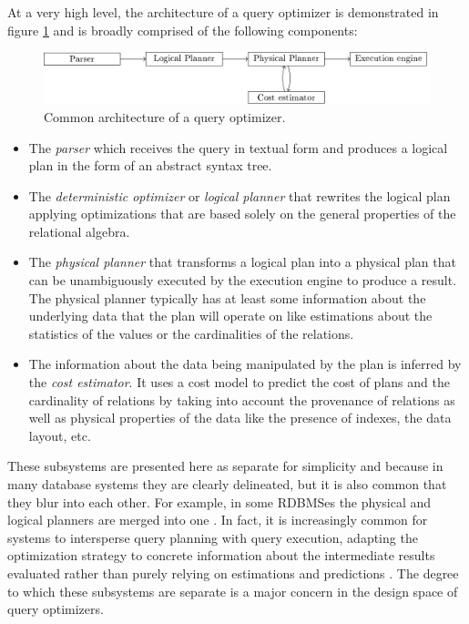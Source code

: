 At a very high level, the architecture of a query optimizer is
demonstrated in figure \ref{fig:optimizer_arch} and is broadly
comprised of the following components:

\begin{figure}[H]
\centering
\includegraphics[width=\textwidth]{./imgs/optimizer_architecture.pdf}
\caption{\label{fig:optimizer_arch}Common architecture of a query
  optimizer.}
\end{figure}

\begin{itemize}

\item The \emph{parser} which receives the query in textual form and
  produces a logical plan in the form of an abstract syntax tree.
\item The \emph{deterministic optimizer} or \emph{logical planner}
  that rewrites the logical plan applying optimizations that are based
  solely on the general properties of the relational algebra.
\item The \emph{physical planner} that transforms a logical plan into
  a physical plan that can be unambiguously executed by the execution
  engine to produce a result. The physical planner typically has at
  least some information about the underlying data that the plan will
  operate on like estimations about the statistics of the values or
  the cardinalities of the relations.
\item The information about the data being manipulated by the plan is
  inferred by the \emph{cost estimator}. It uses a cost model to
  predict the cost of plans and the cardinality of relations by taking
  into account the provenance of relations as well as physical
  properties of the data like the presence of indexes, the data layout,
  etc.
\end{itemize}

These subsystems are presented here as separate for simplicity and
because in many database systems they are clearly delineated, but it is
also common that they blur into each other. For example, in some RDBMSes
the physical and logical planners are merged into one
\cite{graefeCascadesFrameworkQuery1995,shankarQueryOptimizationMicrosoft2012,solimanOrcaModularQuery2014}. In
fact, it is increasingly common for systems to intersperse query
planning with query execution, adapting the optimization strategy
\cite{graefeDynamicQueryEvaluation1989} to concrete information about
the intermediate results evaluated rather than purely relying on
estimations and predictions
\cite{dingPlanStitchHarnessing2018,chaudhuriPayasyougoFrameworkQuery2008,wuSamplingbasedQueryReoptimization2016,herodotouXplusSqltuningawareQuery2010}. The
degree to which these subsystems are separate is a major concern in
the design space of query optimizers.

